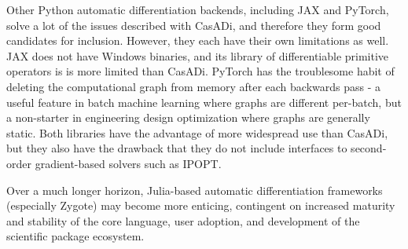 Other Python automatic differentiation backends, including JAX and PyTorch, solve a lot of the issues described with CasADi, and therefore they form good candidates for inclusion. However, they each have their own limitations as well. JAX does not have Windows binaries, and its library of differentiable primitive operators is is more limited than CasADi. PyTorch has the troublesome habit of deleting the computational graph from memory after each backwards pass - a useful feature in batch machine learning where graphs are different per-batch, but a non-starter in engineering design optimization where graphs are generally static. Both libraries have the advantage of more widespread use than CasADi, but they also have the drawback that they do not include interfaces to second-order gradient-based solvers such as IPOPT.

Over a much longer horizon, Julia-based automatic differentiation frameworks (especially Zygote) may become more enticing, contingent on increased maturity and stability of the core language, user adoption, and development of the scientific package ecosystem.

%

%
%
